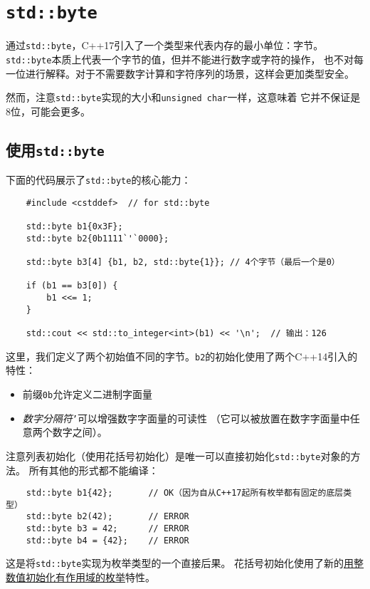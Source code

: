 \chapter{\texttt{std::byte}}\label{ch18}
通过\texttt{std::byte}，C++17引入了一个类型来代表内存的最小单位：字节。
\texttt{std::byte}本质上代表一个字节的值，但并不能进行数字或字符的操作，
也不对每一位进行解释。对于不需要数字计算和字符序列的场景，这样会更加类型安全。

然而，注意\texttt{std::byte}实现的大小和\texttt{unsigned char}一样，这意味着
它并不保证是8位，可能会更多。


\section{使用\texttt{std::byte}}
下面的代码展示了\texttt{std::byte}的核心能力：
\begin{lstlisting}
    #include <cstddef>  // for std::byte

    std::byte b1{0x3F};
    std::byte b2{0b1111`'`0000};

    std::byte b3[4] {b1, b2, std::byte{1}}; // 4个字节（最后一个是0）

    if (b1 == b3[0]) {
        b1 <<= 1;
    }

    std::cout << std::to_integer<int>(b1) << '\n';  // 输出：126
\end{lstlisting}
这里，我们定义了两个初始值不同的字节。\texttt{b2}的初始化使用了两个C++14引入的特性：
\begin{itemize}
    \item 前缀\texttt{0b}允许定义二进制字面量
    \item \emph{数字分隔符}\texttt{'}可以增强数字字面量的可读性
    （它可以被放置在数字字面量中任意两个数字之间）。
\end{itemize}
注意列表初始化（使用花括号初始化）是唯一可以直接初始化\texttt{std::byte}对象的方法。
所有其他的形式都不能编译：
\begin{lstlisting}
    std::byte b1{42};       // OK（因为自从C++17起所有枚举都有固定的底层类型）
    std::byte b2(42);       // ERROR
    std::byte b3 = 42;      // ERROR
    std::byte b4 = {42};    // ERROR
\end{lstlisting}
这是将\texttt{std::byte}实现为枚举类型的一个直接后果。
花括号初始化使用了新的\hyperref[ch8.3]{用整数值初始化有作用域的枚举}特性。

